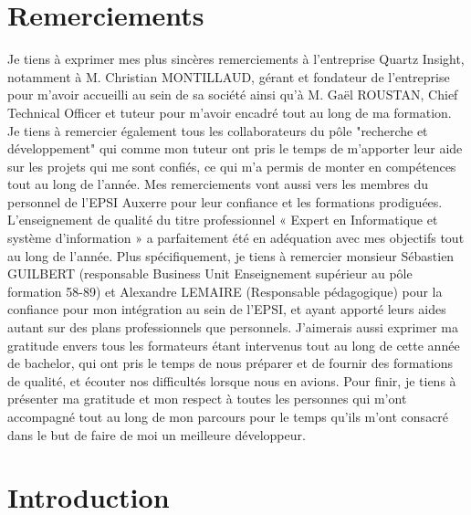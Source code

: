 \documentclass[a4paper, 11pt]{report}
\begin{document}
\chapter{Remerciements}
Je tiens à exprimer mes plus sincères remerciements à l’entreprise Quartz Insight, notamment à M. Christian MONTILLAUD, gérant et fondateur de l’entreprise pour m'avoir accueilli au sein de sa société ainsi qu'à M. Gaël ROUSTAN, Chief Technical Officer et tuteur pour m'avoir encadré tout au long de ma formation.
Je tiens à remercier également tous les collaborateurs du pôle "recherche et développement" qui comme mon tuteur ont pris le temps de m’apporter leur aide sur les projets qui me sont confiés, ce qui m’a permis de monter en compétences tout au long de l’année.
\newline
\newline
Mes remerciements vont aussi vers les membres du personnel de l’EPSI Auxerre pour leur confiance et les formations prodiguées.
L’enseignement de qualité du titre professionnel « Expert en Informatique et système  d’information »  a parfaitement été en adéquation avec mes objectifs tout au long de l’année. 
Plus spécifiquement, je tiens à remercier monsieur Sébastien GUILBERT (responsable Business Unit Enseignement supérieur au pôle formation 58-89) et Alexandre LEMAIRE (Responsable pédagogique) pour la confiance pour mon intégration au sein de l’EPSI, et ayant apporté leurs aides autant sur des plans professionnels que personnels.
\newline
\newline
J’aimerais aussi exprimer ma gratitude envers tous les formateurs étant intervenus tout au long de cette année de bachelor, qui ont pris le temps de nous préparer et de fournir des formations de qualité, et écouter nos difficultés lorsque nous en avions.
\newline
\newline
Pour finir, je tiens à présenter ma gratitude et mon respect à toutes les personnes qui m'ont accompagné tout au long de mon parcours pour le temps qu'ils m'ont consacré dans le but de faire de moi un meilleure développeur.

\chapter{Introduction}
\end{document}
